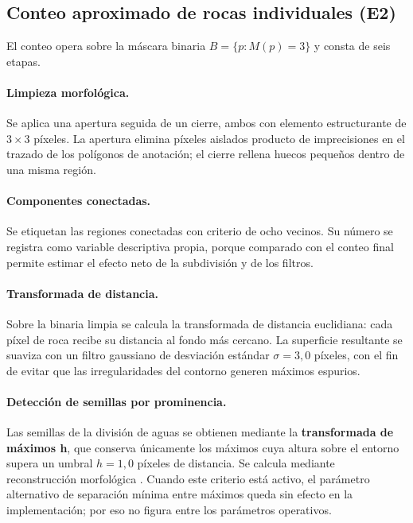\subsection{Conteo aproximado de rocas individuales (E2)}

El conteo opera sobre la máscara binaria $B = \{p : M(p) = 3\}$ y consta de seis etapas.

\paragraph{Limpieza morfológica.} Se aplica una apertura seguida de un cierre, ambos con
elemento estructurante de $3\times3$ píxeles. La apertura elimina píxeles aislados
producto de imprecisiones en el trazado de los polígonos de anotación; el cierre rellena
huecos pequeños dentro de una misma región.

\paragraph{Componentes conectadas.} Se etiquetan las regiones conectadas con criterio de
ocho vecinos. Su número se registra como variable descriptiva propia, porque comparado con el
conteo final permite estimar el efecto neto de la subdivisión y de los filtros.

\paragraph{Transformada de distancia.} Sobre la binaria limpia se calcula la transformada
de distancia euclidiana: cada píxel de roca recibe su distancia al fondo más cercano. La
superficie resultante se suaviza con un filtro gaussiano de desviación estándar
$\sigma = 3{,}0$ píxeles, con el fin de evitar que las irregularidades del contorno
generen máximos espurios.

\paragraph{Detección de semillas por prominencia.} Las semillas de la división de aguas se
obtienen mediante la \textbf{transformada de máximos h}, que conserva únicamente los
máximos cuya altura sobre el entorno supera un umbral $h = 1{,}0$ píxeles de distancia. Se
calcula mediante reconstrucción morfológica \citep{vincent1993reconstruction}. Cuando este
criterio está activo, el parámetro alternativo de separación mínima entre máximos queda sin
efecto en la implementación; por eso no figura entre los parámetros operativos.

